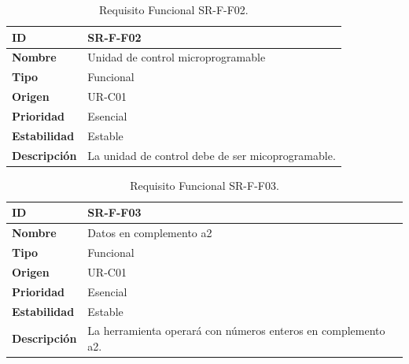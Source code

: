 \begin{center}
\begin{table}[htbp]
\centering
\begin{tabular}{@{}p{2.5cm} p{9cm}@{}} 
\toprule
\textbf{ID} 				& SR-F-F02 \\
\midrule
\textbf{Nombre} 			& Unidad de control microprogramable \\
\midrule
\textbf{Tipo} 			& Funcional \\
\midrule
\textbf{Origen} 			& UR-C01 \\
\midrule
\textbf{Prioridad}		& Esencial \\
\midrule
\textbf{Estabilidad} 		& Estable \\
\midrule
\textbf{Descripción} 	& La unidad de control debe de ser micoprogramable. \\
\bottomrule
\end{tabular}
\caption{Requisito Funcional SR-F-F02.}
\label{tab:srff02}
\end{table}
\end{center}

\begin{center}
\begin{table}[htbp]
\centering
\begin{tabular}{@{}p{2.5cm} p{9cm}@{}} 
\toprule
\textbf{ID} 				& SR-F-F03 \\
\midrule
\textbf{Nombre} 			& Datos en complemento a2 \\
\midrule
\textbf{Tipo} 			& Funcional \\
\midrule
\textbf{Origen} 			& UR-C01 \\
\midrule
\textbf{Prioridad}		& Esencial \\
\midrule
\textbf{Estabilidad} 		& Estable \\
\midrule
\textbf{Descripción} 	& La herramienta operará con números enteros en complemento a2. \\
\bottomrule
\end{tabular}
\caption{Requisito Funcional SR-F-F03.}
\label{tab:srff03}
\end{table}
\end{center}

